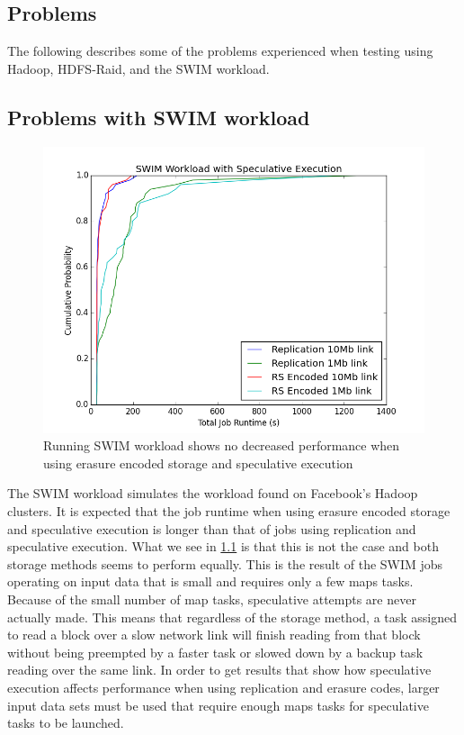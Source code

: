 \documentclass{ucetd}
\begin{document}
\begin{appendices}
    \chapter{Problems}

    The following describes some of the problems experienced when testing using
    Hadoop, HDFS-Raid, and the SWIM workload.

    \section{Problems with SWIM workload}

    \begin{figure}[h]
        \centering
        \includegraphics[scale=0.6]{plots/swim.png}
        \caption[SWIM Workload Test]{Running SWIM workload shows no decreased
            performance when using erasure encoded storage and speculative
        execution}
        \label{swim}
    \end{figure}

    The SWIM workload simulates the workload found on Facebook's Hadoop
    clusters. It is expected that the job runtime when using erasure encoded
    storage and speculative execution is longer than that of jobs using
    replication and speculative execution. What we see in \ref{swim} is that
    this is not the case and both storage methods seems to perform equally. This
    is the result of the SWIM jobs operating on input data that is small and
    requires only a few maps tasks. Because of the small number of map tasks,
    speculative attempts are never actually made. This means that regardless of
    the storage method, a task assigned to read a block over a slow network link
    will finish reading from that block without being preempted by a faster task
    or slowed down by a backup task reading over the same link. In order to get
    results that show how speculative execution affects performance when using
    replication and erasure codes, larger input data sets must be used that
    require enough maps tasks for speculative tasks to be launched.


\end{appendices}
\end{document}
